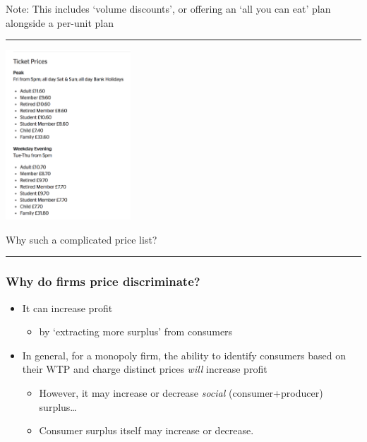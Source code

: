 \documentclass[]{article}
\providecommand{\tightlist}{%
  \setlength{\itemsep}{0pt}\setlength{\parskip}{0pt}}
\begin{document}
Note: This includes `volume discounts', or offering an `all you can eat'
plan alongside a per-unit plan

\begin{center}\rule{0.5\linewidth}{\linethickness}\end{center}

\includegraphics[height=2.5in]{picsfigs/exeter_picturehouse.png}

Why such a complicated price list?

\begin{center}\rule{0.5\linewidth}{\linethickness}\end{center}

\hypertarget{why-do-firms-price-discriminate}{%
\subsubsection{Why do firms price
discriminate?}\label{why-do-firms-price-discriminate}}

\begin{itemize}
\item
  It can increase profit

  \begin{itemize}
  \tightlist
  \item
    by `extracting more surplus' from consumers
  \end{itemize}
\item
  In general, for a monopoly firm, the ability to identify consumers
  based on their WTP and charge distinct prices \emph{will} increase
  profit

  \begin{itemize}
  \tightlist
  \item
    However, it may increase or decrease \emph{social}
    (consumer+producer) surplus\ldots{}
  \item
    Consumer surplus itself may increase or decrease.
  \end{itemize}
\end{itemize}
\end{document}
